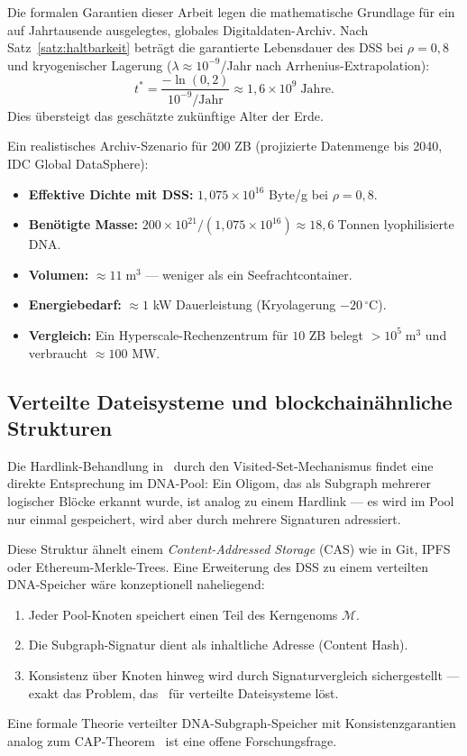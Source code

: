 ﻿\documentclass[a4paper,12pt]{article}
\theoremstyle{definition}
\theoremstyle{plain}
\begin{document}
Die formalen Garantien dieser Arbeit legen die mathematische Grundlage
für ein auf Jahrtausende ausgelegtes, globales Digitaldaten-Archiv.  Nach
Satz~\ref{satz:haltbarkeit} beträgt die garantierte Lebensdauer des DSS
bei $\rho = 0{,}8$ und kryogenischer Lagerung
($\lambda \approx 10^{-9}$/Jahr nach Arrhenius-Extrapolation):
\[
  t^* = \frac{-\ln(0{,}2)}{10^{-9}/\text{Jahr}} \approx 1{,}6 \times 10^9\;\text{Jahre}.
\]
Dies übersteigt das geschätzte zukünftige Alter der Erde.

Ein realistisches Archiv-Szenario für $200$ ZB (projizierte Datenmenge
bis 2040, IDC Global DataSphere):
\begin{itemize}
  \item \textbf{Effektive Dichte mit DSS:}
        $1{,}075 \times 10^{16}$ Byte/g bei $\rho = 0{,}8$.
  \item \textbf{Benötigte Masse:}
        $200 \times 10^{21} / (1{,}075 \times 10^{16}) \approx 18{,}6\;\text{Tonnen}$
        lyophilisierte DNA.
  \item \textbf{Volumen:} $\approx 11\;\text{m}^3$ --- weniger als ein
        Seefrachtcontainer.
  \item \textbf{Energiebedarf:} $\approx 1$ kW Dauerleistung (Kryolagerung
        $-20\,^\circ\mathrm{C}$).
  \item \textbf{Vergleich:} Ein Hyperscale-Rechenzentrum für $10$ ZB
        belegt $> 10^5\;\text{m}^3$ und verbraucht $\approx 100$ MW.
\end{itemize}

\subsection{Verteilte Dateisysteme und blockchainähnliche Strukturen}
\label{ssec:verteilung}

Die Hardlink-Behandlung in~\cite{dusgraph} durch den Visited-Set-Mechanismus
findet eine direkte Entsprechung im DNA-Pool: Ein Oligom, das als Subgraph
mehrerer logischer Blöcke erkannt wurde, ist analog zu einem Hardlink ---
es wird im Pool nur einmal gespeichert, wird aber durch mehrere Signaturen
adressiert.

Diese Struktur ähnelt einem \emph{Content-Addressed Storage} (CAS) wie
in Git, IPFS oder Ethereum-Merkle-Trees.  Eine Erweiterung des DSS
zu einem verteilten DNA-Speicher wäre konzeptionell naheliegend:
\begin{enumerate}
  \item Jeder Pool-Knoten speichert einen Teil des Kerngenoms $\mathcal{M}$.
  \item Die Subgraph-Signatur dient als inhaltliche Adresse (Content Hash).
  \item Konsistenz über Knoten hinweg wird durch Signaturvergleich
        sichergestellt --- exakt das Problem, das~\cite{dusgraph} für
        verteilte Dateisysteme löst.
\end{enumerate}
Eine formale Theorie verteilter DNA-Subgraph-Speicher mit Konsistenzgarantien
analog zum CAP-Theorem~\cite{brewer2000} ist eine offene Forschungsfrage.
\end{document}
